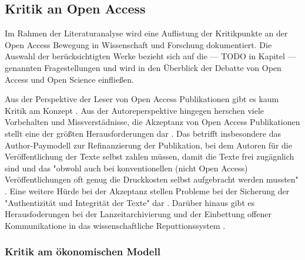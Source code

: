 \subsection{Kritik an Open Access}

Im Rahmen der Literaturanalyse wird eine Auflistung der Kritikpunkte an der Open Access Bewegung in Wissenschaft und Forschung dokumentiert. Die Auswahl der berücksichtigten Werke bezieht sich auf die --- TODO in Kapitel --- genannten Fragestellungen und wird in den Überblick der Debatte von Open Access und Open Science einfließen.

Aus der Perspektive der Leser von Open Access Publikationen gibt es kaum Kritik am Konzept \cite{weishaupt_2009_goldenOA}. Aus der Autoreperspektive hingegen herschen viele Vorbehalten und Missverstädnisse, die Akzeptanz von Open Access Publikationen stellt eine der größten Herausforderungen dar \cite{weishaupt_2009_goldenOA} \cite{Suber_2002}. Das betrifft insbesondere das Author-Paymodell zur Refinanzierung der Publikation, bei dem Autoren für die Veröffentlichung der Texte selbst zahlen müssen, damit die Texte frei zugägnlich sind \cite{suchen} und das "obwohl auch bei konventionellen (nicht Open Access) Veröffentlichungen oft genug die Druckkosten selbst aufgebracht werden mussten" \cite{weishaupt_2009_goldenOA}. Eine weitere Hürde bei der Akzeptanz stellen Probleme bei der Sicherung der "Authentizität und Integrität der Texte" dar \cite{weishaupt_2009_goldenOA}. Darüber hinaus gibt es Herausfoderungen bei der Lanzeitarchivierung und der Einbettung offener Kommunikatione in das wissenschaftliche Reputtionssystem \cite{weishaupt_2009_goldenOA} \cite{Suber_2002} \cite{Adema_2014_open_access}.

\subsubsection{Kritik am ökonomischen Modell}

